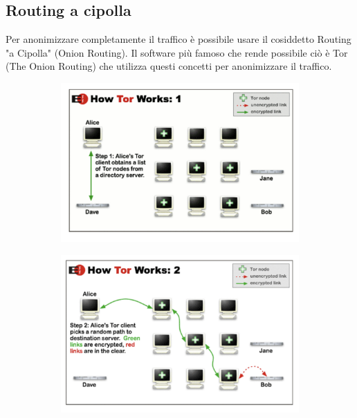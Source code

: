 \subsection{Routing a cipolla}
Per anonimizzare completamente il traffico è possibile usare il cosiddetto Routing "a Cipolla" (Onion Routing).
Il software più famoso che rende possibile ciò è Tor (The Onion Routing) che utilizza questi concetti per anonimizzare il traffico.

\begin{figure}[h!]
    \centering
    \begin{subfigure}{.5\textwidth}
        \centering
        \includegraphics[width=1\linewidth]{res/tor1.png}
    \end{subfigure}%
    \begin{subfigure}{.5\textwidth}
        \centering
        \includegraphics[width=1\linewidth]{res/tor2.png}
    \end{subfigure}

\end{figure}
